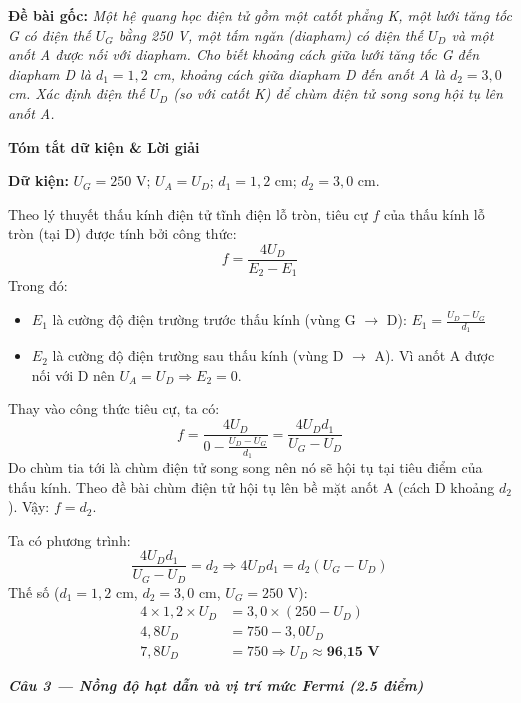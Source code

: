 \documentclass[11pt,a4paper,twocolumn]{article}
\begin{document}
\textbf{Đề bài gốc:} \textit{Một hệ quang học điện tử gồm một catốt phẳng K, một lưới tăng tốc G có điện thế $U_G$ bằng 250 V, một tấm ngăn (diapham) có điện thế $U_D$ và một anốt A được nối với diapham. Cho biết khoảng cách giữa lưới tăng tốc G đến diapham D là $d_1 = 1,2$ cm, khoảng cách giữa diapham D đến anốt A là $d_2 = 3,0$ cm. Xác định điện thế $U_D$ (so với catốt K) để chùm điện tử song song hội tụ lên anốt A.}

\textbf{Tóm tắt dữ kiện \& Lời giải}

\textbf{Dữ kiện:} $U_G = 250$ V; $U_A = U_D$; $d_1 = 1,2$ cm; $d_2 = 3,0$ cm.

Theo lý thuyết thấu kính điện tử tĩnh điện lỗ tròn, tiêu cự $f$ của thấu kính lỗ tròn (tại D) được tính bởi công thức:
\begin{equation*}
    \boxed{f = \frac{4U_D}{E_2 - E_1}}
\end{equation*}
Trong đó:
\begin{itemize}[leftmargin=*, topsep=0pt, itemsep=0pt]
    \item $E_1$ là cường độ điện trường trước thấu kính (vùng G $\rightarrow$ D): $E_1 = \frac{U_D - U_G}{d_1}$
    \item $E_2$ là cường độ điện trường sau thấu kính (vùng D $\rightarrow$ A). Vì anốt A được nối với D nên $U_A = U_D \Rightarrow E_2 = 0$.
\end{itemize}

Thay vào công thức tiêu cự, ta có:
\begin{equation*}
    f = \frac{4U_D}{0 - \frac{U_D - U_G}{d_1}} = \frac{4U_D d_1}{U_G - U_D}
\end{equation*}
Do chùm tia tới là chùm điện tử song song nên nó sẽ hội tụ tại tiêu điểm của thấu kính. Theo đề bài chùm điện tử hội tụ lên bề mặt anốt A (cách D khoảng $d_2$). Vậy: $f = d_2$.

Ta có phương trình:
\begin{equation*}
    \frac{4U_D d_1}{U_G - U_D} = d_2 \Rightarrow 4 U_D d_1 = d_2 (U_G - U_D)
\end{equation*}
Thế số ($d_1 = 1,2$ cm, $d_2 = 3,0$ cm, $U_G = 250$ V):
\begin{align*}
    4 \times 1,2 \times U_D &= 3,0 \times (250 - U_D) \\
    4,8 U_D &= 750 - 3,0 U_D \\
    7,8 U_D &= 750 \Rightarrow U_D \approx \textbf{96,15 V}
\end{align*}

\vspace{0.4cm}
\textbf{\textit{Câu 3 --- Nồng độ hạt dẫn và vị trí mức Fermi (2.5 điểm)}}
\end{document}

